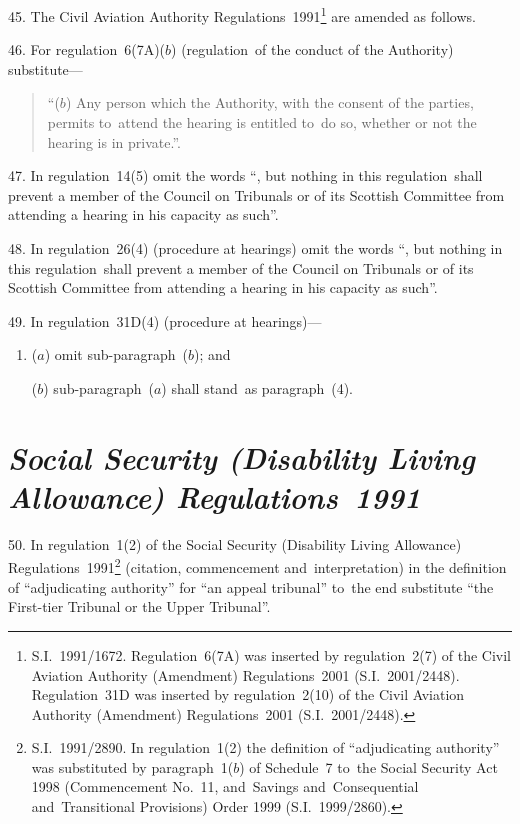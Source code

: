 \documentclass[12pt,a4paper]{article}
\begin{document}
45.  The Civil Aviation Authority Regulations~1991\footnote{S.I.~1991/1672. Regulation~6(7A) was inserted by regulation~2(7) of the Civil Aviation Authority (Amendment) Regulations~2001 (S.I.~2001/2448). Regulation~31D was inserted by regulation~2(10) of the Civil Aviation Authority (Amendment) Regulations~2001 (S.I.~2001/2448).} are amended as follows.

\medskip

46.  For regulation~6(7A)($b$)  (regulation~of the conduct of the Authority) substitute—
\begin{quotation}
“($b$) Any person which the Authority, with the consent of the parties, permits to~attend the hearing is entitled to~do so, whether or not the hearing is in private.”.
\end{quotation}

\medskip

47.  In regulation~14(5) omit the words “, but nothing in this regulation~shall prevent a member of the Council on Tribunals or of its Scottish Committee from attending a hearing in his capacity as such”.

\medskip

48.  In regulation~26(4) (procedure at hearings) omit the words “, but nothing in this regulation~shall prevent a member of the Council on Tribunals or of its Scottish Committee from attending a hearing in his capacity as such”.

\enlargethispage{-2\baselineskip}

\medskip

49.  In regulation~31D(4) (procedure at hearings)—
\begin{enumerate}\item[]
($a$) omit sub-paragraph~($b$); and

($b$) sub-paragraph~($a$)  shall stand~as paragraph~(4).
\end{enumerate}

\section*{\itshape Social Security (Disability Living Allowance) Regulations~1991}

50.  In regulation~1(2) of the Social Security (Disability Living Allowance) Regulations~1991\footnote{S.I.~1991/2890. In regulation~1(2) the definition of “adjudicating authority” was substituted by paragraph~1($b$) of Schedule~7 to~the Social Security Act 1998 (Commencement No.~11, and~Savings and~Consequential and~Transitional Provisions) Order 1999 (S.I.~1999/2860).} (citation, commencement and~interpretation) in the definition of “adjudicating authority” for “an appeal tribunal” to~the end substitute “the First-tier Tribunal or the Upper Tribunal”.
\end{document}
